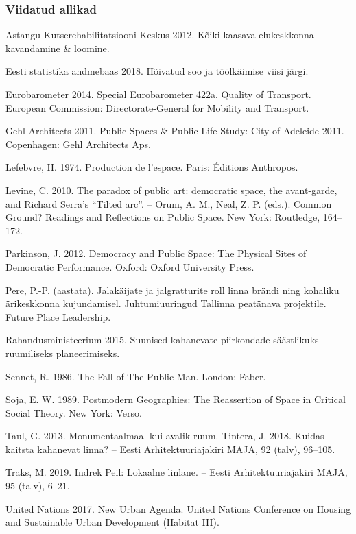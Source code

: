 \documentclass[estonian,]{article}
\begin{document}
\hypertarget{viidatud-allikad-6}{%
\subsubsection*{Viidatud allikad}\label{viidatud-allikad-6}}

Astangu Kutserehabilitatsiooni Keskus 2012. Kõiki kaasava elukeskkonna kavandamine \& loomine.

Eesti statistika andmebaas 2018. Hõivatud soo ja töölkäimise viisi järgi.

Eurobarometer 2014. Special Eurobarometer 422a. Quality of Transport. European Commission: Directorate-General for Mobility and Transport.

Gehl Architects 2011. Public Spaces \& Public Life Study: City of Adeleide 2011. Copenhagen: Gehl Architects Aps.

Lefebvre, H. 1974. Production de l'espace. Paris: Éditions Anthropos.

Levine, C. 2010. The paradox of public art: democratic space, the avant-garde, and Richard Serra's ``Tilted arc''. -- Orum, A. M., Neal, Z. P. (eds.). Common Ground? Readings and Reflections on Public Space. New York: Routledge, 164--172.

Parkinson, J. 2012. Democracy and Public Space: The Physical Sites of Democratic Performance. Oxford: Oxford University Press.

Pere, P.-P. (aastata). Jalakäijate ja jalgratturite roll linna brändi ning kohaliku ärikeskkonna kujundamisel. Juhtumiuuringud Tallinna peatänava projektile. Future Place Leadership.

Rahandusministeerium 2015. Suunised kahanevate piirkondade säästlikuks ruumiliseks planeerimiseks.

Sennet, R. 1986. The Fall of The Public Man. London: Faber.

Soja, E. W. 1989. Postmodern Geographies: The Reassertion of Space in Critical Social Theory. New York: Verso.

Taul, G. 2013. Monumentaalmaal kui avalik ruum.
Tintera, J. 2018. Kuidas kaitsta kahanevat linna? -- Eesti Arhitektuuriajakiri MAJA, 92 (talv), 96--105.

Traks, M. 2019. Indrek Peil: Lokaalne linlane. -- Eesti Arhitektuuriajakiri MAJA, 95 (talv), 6--21.

United Nations 2017. New Urban Agenda. United Nations Conference on Housing and Sustainable Urban Development (Habitat III).
\end{document}
